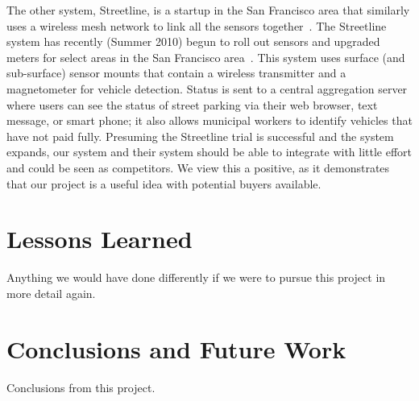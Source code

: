 \documentclass{acm_proc}
\begin{document}
The other system, Streetline, is a startup in the San Francisco area
that similarly uses a wireless mesh network to link all the sensors
together~\cite{pgi:streetline}.
The Streetline system has recently (Summer 2010) begun to roll out sensors
and upgraded meters for select areas in the San Francisco
area~\cite{wired:streetline, sfpark}.
This system uses surface (and sub-surface) sensor mounts that contain a
wireless transmitter and a magnetometer for vehicle detection.
Status is sent to a central aggregation server where users can see the
status of street parking via their web browser, text message, or smart
phone; it also allows municipal workers to identify vehicles that have not
paid fully.
Presuming the Streetline trial is successful and the system expands, our
system and their system should be able to integrate with little effort and
could be seen as competitors.
We view this a positive, as it demonstrates that our project is a useful
idea with potential buyers available.

\section{Lessons Learned}\label{sec:lessons}

Anything we would have done differently if we were to pursue this project
in more detail again.

\section{Conclusions and Future Work}\label{sec:conclusions}

Conclusions from this project.



\end{document}
